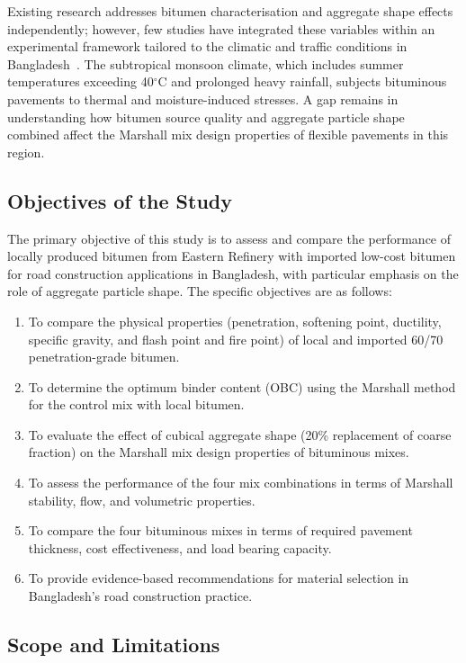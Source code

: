\documentclass[12pt,a4paper]{article}
\begin{document}
Existing research addresses bitumen characterisation and aggregate shape effects independently; however, few studies have integrated these variables within an experimental framework tailored to the climatic and traffic conditions in Bangladesh~\cite{sood2015evaluation}. The subtropical monsoon climate, which includes summer temperatures exceeding 40$^{\circ}$C and prolonged heavy rainfall, subjects bituminous pavements to thermal and moisture-induced stresses. A gap remains in understanding how bitumen source quality and aggregate particle shape combined affect the Marshall mix design properties of flexible pavements in this region.

\subsection{Objectives of the Study}

The primary objective of this study is to assess and compare the performance of locally produced bitumen from Eastern Refinery with imported low-cost bitumen for road construction applications in Bangladesh, with particular emphasis on the role of aggregate particle shape. The specific objectives are as follows:

\begin{enumerate}[label=\roman*.]
    \item To compare the physical properties (penetration, softening point, ductility, specific gravity, and flash point and fire point) of local and imported 60/70 penetration-grade bitumen.
    \item To determine the optimum binder content (OBC) using the Marshall method for the control mix with local bitumen.
    \item To evaluate the effect of cubical aggregate shape (20\% replacement of coarse fraction) on the Marshall mix design properties of bituminous mixes.
    \item To assess the performance of the four mix combinations in terms of Marshall stability, flow, and volumetric properties.
    \item To compare the four bituminous mixes in terms of required pavement thickness, cost effectiveness, and load bearing capacity.
    \item To provide evidence-based recommendations for material selection in Bangladesh's road construction practice.
\end{enumerate}

\subsection{Scope and Limitations}
\end{document}
